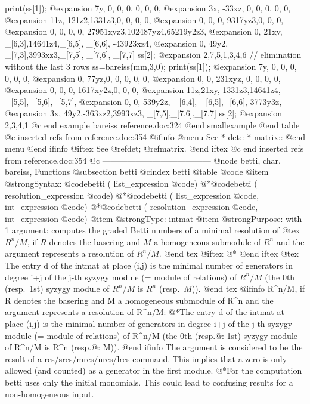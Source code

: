   print(ss[1]);
@expansion{} 7y, 0,     0,     0,      0,        0,        0,        
@expansion{} 3x, -33xz, 0,     0,      0,        0,        0,        
@expansion{} 11z,-121z2,1331z3,0,      0,        0,        0,        
@expansion{} 0,  0,     0,     9317yz3,0,        0,        0,        
@expansion{} 0,  0,     0,     0,      27951xyz3,102487yz4,65219y2z3,
@expansion{} 0,  21xy,  _[6,3],14641z4,_[6,5],   _[6,6],   -43923xz4,
@expansion{} 0,  49y2,  _[7,3],3993xz3,_[7,5],   _[7,6],   _[7,7]    
  ss[2];
@expansion{} 2,7,5,1,3,4,6
  // elimination without the last 3 rows
  ss=bareiss(mm,3,0);
  print(ss[1]);
@expansion{} 7y, 0,   0,      0,       0,     0,     0,       
@expansion{} 0,  77yz,0,      0,       0,     0,     0,       
@expansion{} 0,  0,   231xyz, 0,       0,     0,     0,       
@expansion{} 0,  0,   0,      1617xy2z,0,     0,     0,       
@expansion{} 11z,21xy,-1331z3,14641z4, _[5,5],_[5,6],_[5,7],  
@expansion{} 0,  0,   539y2z, _[6,4],  _[6,5],_[6,6],-3773y3z,
@expansion{} 3x, 49y2,-363xz2,3993xz3, _[7,5],_[7,6],_[7,7]   
  ss[2];
@expansion{} 2,3,4,1
@c end example bareiss reference.doc:324
@end smallexample
@end table
@c inserted refs from reference.doc:354
@ifinfo
@menu
See
* det::
* matrix::
@end menu
@end ifinfo
@iftex
See
@ref{det};
@ref{matrix}.
@end iftex
@c end inserted refs from reference.doc:354
@c ---------------------------------------
@node betti, char, bareiss, Functions
@subsection betti
@cindex betti
@table @code
@item @strong{Syntax:}
@code{betti (} list_expression @code{)}
@*@code{betti (} resolution_expression @code{)}
@*@code{betti (} list_expression @code{,} int_expression @code{)}
@*@code{betti (} resolution_expression @code{,} int_expression @code{)}
@item @strong{Type:}
intmat
@item @strong{Purpose:}
with 1 argument: computes the graded Betti numbers of a minimal resolution of
@tex
$R^n/M$, if $R$ denotes the basering and
$M$ a homogeneous submodule of $R^n$ and the argument represents a
resolution of
$R^n/M$.
@end tex
@iftex
@*
@end iftex
@tex
The entry d of the intmat at place (i,j) is the minimal number of
generators in degree i+j of the j-th syzygy module (= module of
relations) of $R^n/M$ (the 0th (resp.\ 1st) syzygy module of $R^n/M$ is
$R^n$ (resp.\ $M$)).
@end tex
@ifinfo
R^n/M, if R denotes the basering and
M a homogeneous submodule of R^n and the argument represents a resolution of
R^n/M:
@*The entry d of the intmat at place (i,j) is the minimal number of
generators in degree i+j of the j-th syzygy module (= module of
relations) of R^n/M (the 0th (resp.@: 1st) syzygy module of R^n/M is R^n
(resp.@: M)).
@end ifinfo
The argument is considered to be the result of a res/sres/mres/nres/lres
command. This implies that a zero is only allowed (and counted) as a
generator in the first module.
@*For the computation betti uses only the initial monomials. This could lead
to confusing results for a non-homogeneous input.

